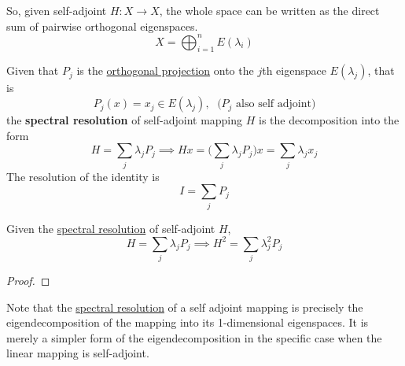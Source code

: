 	So, given self-adjoint $H: X \to X$, the whole space can be written as the direct sum of pairwise orthogonal eigenspaces. 
	\begin{equation}
		X = \bigoplus_{i=1}^n E(\lambda_i)
	\end{equation}

	\begin{definition}
	  \label{def:spectral-resolution}
    Given that $P_j$ is the \hyperref[def:orthogonal-projection]{orthogonal projection} onto the $j$th eigenspace $E(\lambda_j)$, that is
    \begin{equation}
      P_j (x) = x_j \in E(\lambda_j), \; \text{ ($P_j$ also self adjoint)}
    \end{equation}
    the \textbf{spectral resolution} of self-adjoint mapping $H$ is the decomposition into the form 
    \begin{equation}
      H = \sum_j \lambda_j P_j \implies H x = \bigg( \sum_j \lambda_j P_j \bigg) x = \sum_j \lambda_j x_j
    \end{equation}
    The resolution of the identity is
    \begin{equation}
      I = \sum_j P_j
    \end{equation}
  \end{definition}

  \begin{theorem}
    \label{thm:functional-calculus-via-the-spectral-resolution}
    Given the \hyperref[def:spectral-resolution]{spectral resolution} of self-adjoint $H$, 
    \begin{equation}
      H  = \sum_j \lambda_j P_j \implies H^2 = \sum_j \lambda_j^2 P_j
    \end{equation}
  \end{theorem}
	\begin{proof}
	  
	\end{proof}

  Note that the \hyperref[def:spectral-resolution]{spectral resolution} of a self adjoint mapping is precisely the eigendecomposition of the mapping into its 1-dimensional eigenspaces. It is merely a simpler form of the eigendecomposition in the specific case when the linear mapping is self-adjoint. 

